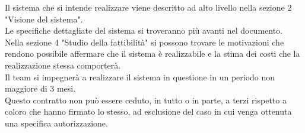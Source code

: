 Il sistema che si intende realizzare viene descritto ad alto livello nella sezione 2 "Visione del sistema".\\
Le specifiche dettagliate del sistema si troveranno più avanti nel documento.\\
Nella sezione 4 "Studio della fattibilità" si possono trovare le motivazioni che rendono possibile affermare che
il sistema è realizzabile e la stima dei costi che la realizzazione stessa comporterà.\\
Il team si impegnerà a realizzare il sistema in questione in un periodo non maggiore di 3 mesi.\\
Questo contratto non può essere ceduto, in tutto o in parte, a terzi rispetto a coloro che hanno firmato lo stesso, ad esclusione del caso in cui venga ottenuta una specifica autorizzazione.

